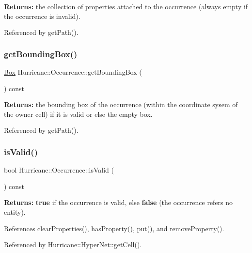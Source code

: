 {\bfseries Returns\+:} the collection of properties attached to the occurrence (always empty if the occurrence is invalid). 

Referenced by get\+Path().

\mbox{\label{classHurricane_1_1Occurrence_a6c808dba6637c716075e0887c5f25518}} 
\subsubsection{\texorpdfstring{get\+Bounding\+Box()}{getBoundingBox()}}
{\footnotesize\ttfamily \hyperlink{classHurricane_1_1Box}{Box} Hurricane\+::\+Occurrence\+::get\+Bounding\+Box (\begin{DoxyParamCaption}{ }\end{DoxyParamCaption}) const}

{\bfseries Returns\+:} the bounding box of the occurrence (within the coordinate sysem of the owner cell) if it is valid or else the empty box. 

Referenced by get\+Path().

\mbox{\label{classHurricane_1_1Occurrence_ade38e5da7eb5d8701cd3a8f252cdf62f}} 
\subsubsection{\texorpdfstring{is\+Valid()}{isValid()}}
{\footnotesize\ttfamily bool Hurricane\+::\+Occurrence\+::is\+Valid (\begin{DoxyParamCaption}{ }\end{DoxyParamCaption}) const\hspace{0.3cm}{\ttfamily [inline]}}

{\bfseries Returns\+:} {\bfseries true} if the occurrence is valid, else {\bfseries false} (the occurrence refers no entity). 

References clear\+Properties(), has\+Property(), put(), and remove\+Property().



Referenced by Hurricane\+::\+Hyper\+Net\+::get\+Cell().

